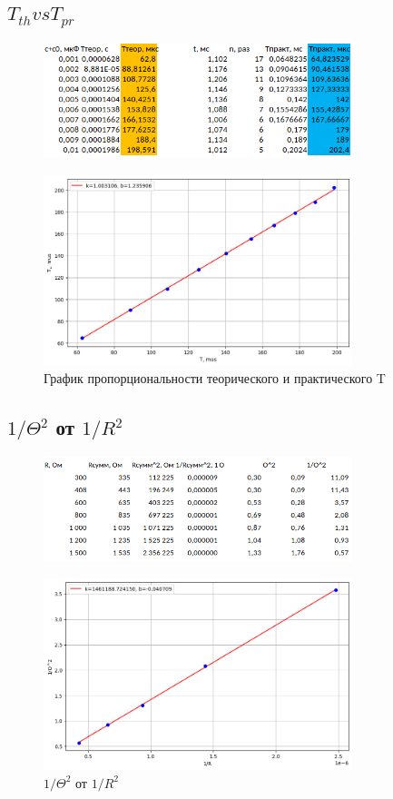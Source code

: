 \documentclass[a4paper, 12pt]{article}
\begin{document}
\subsection{$T_{th} vs T_{pr}$}

\begin{figure}[h!]
    \centering
    \includegraphics[width=90mm]{./petya/image copy.png}
\end{figure}



\begin{figure}[h!]
    \centering
    \includegraphics[width=90mm]{./imgs/лист3.jpg}
    \caption{График пропорциональности теорического и практического T}
\end{figure}

\newpage
\subsection{$1/\Theta^2$ от $1/R^2$}

\begin{figure}[h!]
    \centering
    \includegraphics[width=90mm]{./petya/image.png}
\end{figure}


\begin{figure}[h!]
    \centering
    \includegraphics[width=90mm]{./imgs/лист4.png}
    \caption{$1/\Theta^2$ от $1/R^2$}
\end{figure}
\end{document}
